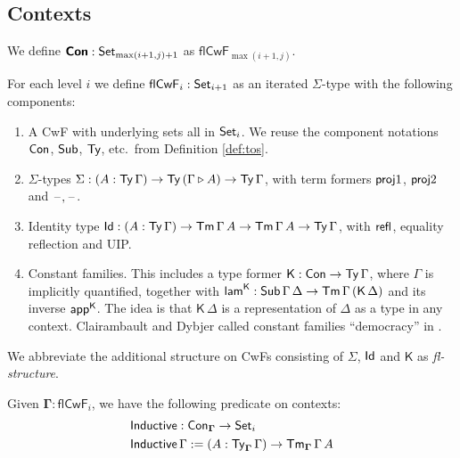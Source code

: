 \documentclass[sigplan,review,anonymous]{acmart}\settopmatter{printfolios=true,printccs=false,printacmref=false}
\newcommand{\ext}{\triangleright}
\newcommand{\Inductive}{\mathsf{Inductive}}
\newcommand{\Sg}{\Sigma}
\newcommand{\flCwF}{\mathsf{flCwF}}
\newcommand{\Kfam}{\mathsf{K}}
\newcommand{\lamK}{\mathsf{lam}^{\K}}
\newcommand{\appK}{\mathsf{app}^{\K}}
\newcommand{\bCon}{\boldsymbol{\Con}}
\newcommand{\bGamma}{\boldsymbol{\Gamma}}
\begin{document}
\subsection{Contexts}

We define $\bCon : \Set_{\max(i+1,j)+1}$ as $\flCwF_{\max(i+1,j)}$.

\begin{definition}\label{def:flCwF}
For each level $i$ we define $\flCwF_i : \Set_{i+1}$ as an iterated $\Sigma$-type
with the following components:
\begin{enumerate}
  \item A CwF with underlying sets all in $\mathsf{Set}_i$. We reuse the component
    notations $\mathsf{Con}$, $\mathsf{Sub}$, $\mathsf{Ty}$, etc.\ from Definition \ref{def:tos}.
  \item $\Sigma$-types $\Sg : (A : \Ty\,\Gamma)\ra \Ty\,(\Gamma \ext A)
    \ra \Ty\,\Gamma$, with term formers $\mathsf{proj}1$, $\mathsf{proj}2$ and $\mathord{\hspace{1pt}\text{--}\hspace{1pt}},\mathord{\hspace{1pt}\text{--}\hspace{1pt}}$.
  \item Identity type $\mathsf{Id} : (A : \mathsf{Ty}\,\Gamma)\rightarrow \mathsf{Tm}\,\Gamma\,A\rightarrow
    \mathsf{Tm}\,\Gamma\,A\rightarrow \mathsf{Ty}\,\Gamma$, with $\mathsf{refl}$, equality reflection and UIP.
  \item Constant families. This includes a type former $\Kfam : \Con \ra
    \Ty\,\Gamma$, where $\Gamma$ is implicitly quantified, together with $\lamK
    : \Sub\,\Gamma\,\Delta \ra \Tm\,\Gamma\,(\Kfam\,\Delta)$ and its inverse
    $\appK$. The idea is that $\Kfam\,\Delta$ is a representation of $\Delta$ as
    a type in any context. Clairambault and Dybjer called constant families
    ``democracy'' in \cite{clairambault2014biequivalence}.
\end{enumerate}
\end{definition}

\begin{definition} We abbreviate the additional structure on CwFs consisting of $\Sigma$, $\mathsf{Id}$ and
$\Kfam$ as \emph{fl-structure}.
\end{definition}


\begin{definition}\label{def:induction}
Given $\bGamma : \flCwF_i$, we have the following predicate on contexts:
\begin{alignat*}{3}
  & \Inductive : \Con_{\bGamma} \ra \Set_i \\
  & \Inductive\,\Gamma := (A : \Ty_{\bGamma}\,\Gamma)\ra \Tm_{\bGamma}\,\Gamma\,A
\end{alignat*}
\end{definition}
\end{document}
